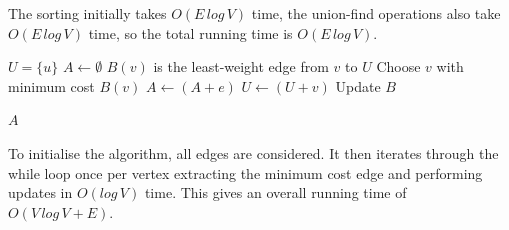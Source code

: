 \noindent The sorting initially takes \(O(E\,log\,V)\) time, the union-find operations also take \(O(E\,log\,V)\) time, so the total running time is \(O(E\,log\,V)\).

{
    \State \(U = \{u\}\)
    \State \(A \gets \emptyset\)
        \State \(B(v)\) is the least-weight edge from \(v\) to \(U\)
    \EndFor
        \State Choose \(v\) with minimum cost \(B(v)\)
        \State \(A \gets (A + e)\)
        \State \(U \gets (U + v)\)
        \State Update \(B\)
    \EndWhile
    
    \Return \(A\)
}

\noindent To initialise the algorithm, all edges are considered. It then iterates through the while loop once per vertex extracting the minimum cost edge and performing updates in \(O(log\,V)\) time. This gives an overall running time of \(O(V\,log\,V + E)\).